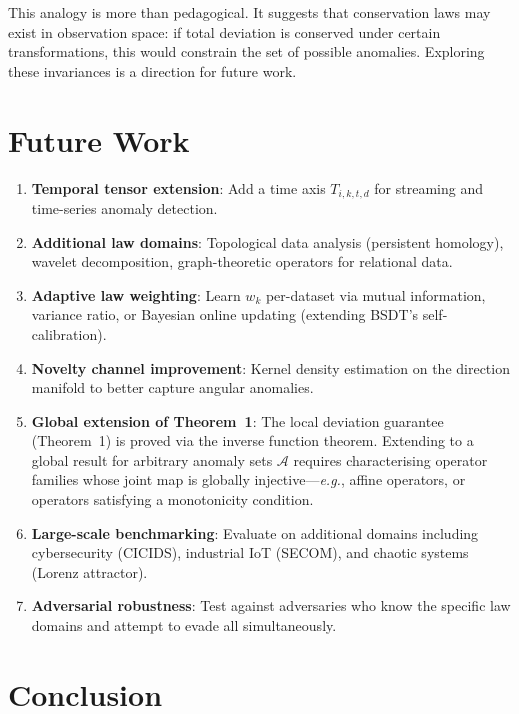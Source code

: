 \documentclass[journal]{IEEEtran}
\newcommand{\eg}{\textit{e.g.}}
\begin{document}
This analogy is more than pedagogical. It suggests that conservation laws may exist in observation space: if total deviation is conserved under certain transformations, this would constrain the set of possible anomalies. Exploring these invariances is a direction for future work.

\section{Future Work}
\label{sec:future}

\begin{enumerate}
  \item \textbf{Temporal tensor extension}: Add a time axis $T_{i,k,t,d}$ for streaming and time-series anomaly detection.
  \item \textbf{Additional law domains}: Topological data analysis (persistent homology), wavelet decomposition, graph-theoretic operators for relational data.
  \item \textbf{Adaptive law weighting}: Learn $w_k$ per-dataset via mutual information, variance ratio, or Bayesian online updating (extending BSDT's self-calibration).
  \item \textbf{Novelty channel improvement}: Kernel density estimation on the direction manifold to better capture angular anomalies.
  \item \textbf{Global extension of Theorem~1}: The local deviation guarantee (Theorem~1) is proved via the inverse function theorem. Extending to a global result for arbitrary anomaly sets $\mathcal{A}$ requires characterising operator families whose joint map is globally injective---\eg, affine operators, or operators satisfying a monotonicity condition.
  \item \textbf{Large-scale benchmarking}: Evaluate on additional domains including cybersecurity (CICIDS), industrial IoT (SECOM), and chaotic systems (Lorenz attractor).
  \item \textbf{Adversarial robustness}: Test against adversaries who know the specific law domains and attempt to evade all simultaneously.
\end{enumerate}

\section{Conclusion}
\label{sec:conclusion}
\end{document}
